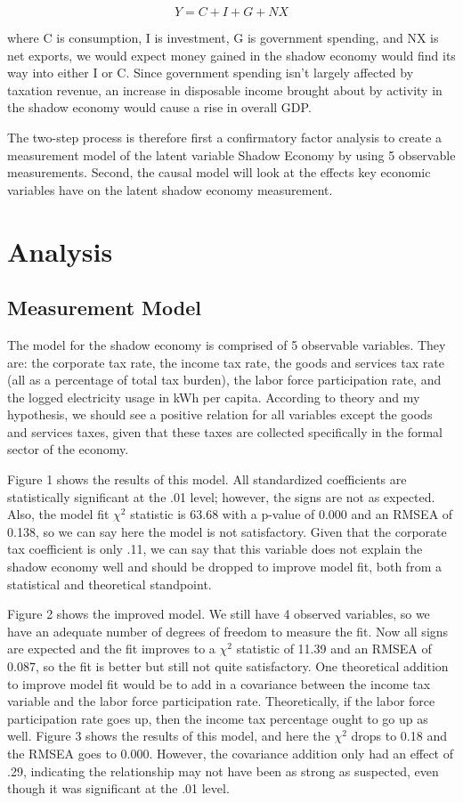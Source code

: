 \documentclass[12pt]{report}
\begin{document}
\begin{equation}
Y = C + I + G + NX
\end{equation}

where C is consumption, I is investment, G is government spending, and NX is net exports, we would expect money gained in the shadow economy would find its way into either I or C. Since government spending isn't largely affected by taxation revenue, an increase in disposable income brought about by activity in the shadow economy would cause a rise in overall GDP.

The two-step process is therefore first a confirmatory factor analysis to create a measurement model of the latent variable Shadow Economy by using 5 observable measurements. Second, the causal model will look at the effects key economic variables have on the latent shadow economy measurement.

\section*{Analysis}
\subsection*{Measurement Model}

The model for the shadow economy is comprised of 5 observable variables. They are: the corporate tax rate, the income tax rate, the goods and services tax rate (all as a percentage of total tax burden), the labor force participation rate, and the logged electricity usage in kWh per capita. According to theory and my hypothesis, we should see a positive relation for all variables except the goods and services taxes, given that these taxes are collected specifically in the formal sector of the economy. 

Figure 1 shows the results of this model. All standardized coefficients are statistically significant at the .01 level; however, the signs are not as expected. Also, the model fit $\chi^2$ statistic is 63.68 with a p-value of 0.000 and an RMSEA of 0.138, so we can say here the model is not satisfactory. Given that the corporate tax coefficient is only .11, we can say that this variable does not explain the shadow economy well and should be dropped to improve model fit, both from a statistical and theoretical standpoint.

Figure 2 shows the improved model. We still have 4 observed variables, so we have an adequate number of degrees of freedom to measure the fit. Now all signs are expected and the fit improves to a $\chi^2$ statistic of 11.39 and an RMSEA of 0.087, so the fit is better but still not quite satisfactory. One theoretical addition to improve model fit would be to add in a covariance between the income tax variable and the labor force participation rate. Theoretically, if the labor force participation rate goes up, then the income tax percentage ought to go up as well. Figure 3 shows the results of this model, and here the $\chi^2$ drops to 0.18 and the RMSEA goes to 0.000. However, the covariance addition only had an effect of .29, indicating the relationship may not have been as strong as suspected, even though it was significant at the .01 level.
\end{document}

